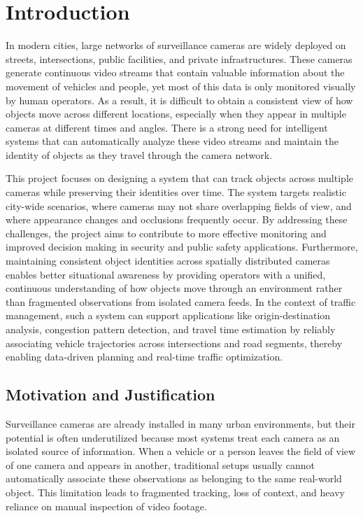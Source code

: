 \chapter{Introduction}

In modern cities, large networks of surveillance cameras are widely deployed on streets, intersections, public facilities, and private infrastructures. These cameras generate continuous video streams that contain valuable information about the movement of vehicles and people, yet most of this data is only monitored visually by human operators. As a result, it is difficult to obtain a consistent view of how objects move across different locations, especially when they appear in multiple cameras at different times and angles. There is a strong need for intelligent systems that can automatically analyze these video streams and maintain the identity of objects as they travel through the camera network.

This project focuses on designing a system that can track objects across multiple cameras while preserving their identities over time. The system targets realistic city-wide scenarios, where cameras may not share overlapping fields of view, and where appearance changes and occlusions frequently occur. By addressing these challenges, the project aims to contribute to more effective monitoring and improved decision making in security and public safety applications. Furthermore, maintaining consistent object identities across spatially distributed cameras enables better situational awareness by providing operators with a unified, continuous understanding of how objects move through an environment rather than fragmented observations from isolated camera feeds. In the context of traffic management, such a system can support applications like origin-destination analysis, congestion pattern detection, and travel time estimation by reliably associating vehicle trajectories across intersections and road segments, thereby enabling data-driven planning and real-time traffic optimization.

\section{Motivation and Justification}

Surveillance cameras are already installed in many urban environments, but their potential is often underutilized because most systems treat each camera as an isolated source of information. When a vehicle or a person leaves the field of view of one camera and appears in another, traditional setups usually cannot automatically associate these observations as belonging to the same real-world object. This limitation leads to fragmented tracking, loss of context, and heavy reliance on manual inspection of video footage.

